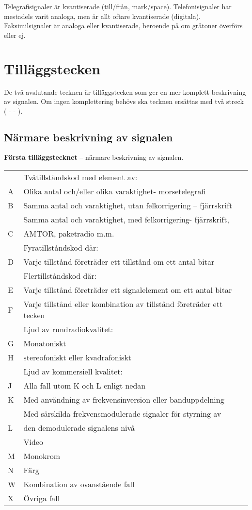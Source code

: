 \noindent
Telegrafisignaler är kvantiserade (till/från, mark/\-space).
Telefonisignaler har mestadels varit analoga, men är allt oftare
kvantiserade (digitala). Faksimilsignaler är analoga eller
kvantiserade, beroende på om gråtoner överförs eller ej.


\section{Tilläggstecken}
De två avslutande tecknen är tilläggstecken som ger en mer
komplett beskrivning av signalen. Om ingen komplettering behövs
ska tecknen ersättas med två streck ( - - ).

\subsection{Närmare beskrivning av signalen}
\textbf{Första tilläggstecknet} -- närmare beskrivning av signalen.\\[1ex]
\begin{tabular}{lp{7cm}}
  &	Tvåtillståndskod med element av: \\
A &	Olika antal och/eller olika varaktighet- morsetelegrafi \\
B &	Samma antal och varaktighet, utan felkorrigering -- fjärrskrift \\
  &	Samma antal och varaktighet, med felkorrigering- fjärrskrift, \\
C &	AMTOR, paketradio m.m. \\
  &	Fyratillståndskod där: \\
D &	Varje tillstånd företräder ett tillstånd om ett antal bitar \\
  &	Flertillståndskod där: \\
E &	Varje tillstånd företräder ett signalelement om ett antal bitar \\
F &	Varje tillstånd eller kombination av tillstånd företräder ett tecken \\
  &	Ljud av rundradiokvalitet: \\
G &	Monatoniskt \\
H &	stereofoniskt eller kvadrafoniskt \\
  &	Ljud av kommersiell kvalitet: \\
J &	Alla fall utom K och L enligt nedan \\
K &	Med användning av frekvensinversion eller banduppdelning \\
  &	Med särskilda frekvensmodulerade signaler för styrning av \\
L &	den demodulerade signalens nivå \\
  &	Video \\
M &	Monokrom \\
N &	Färg \\
W &	Kombination av ovanstående fall \\
X &	Övriga fall \\
\end{tabular}

